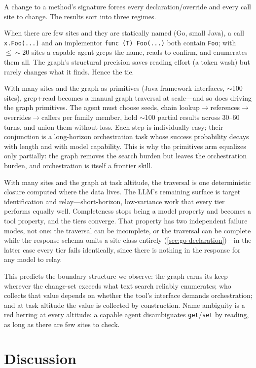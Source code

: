 \documentclass[11pt]{article}
\newcommand{\code}[1]{\texttt{#1}}
\begin{document}
A change to a method's signature forces every declaration/override and
every call site to change. The results sort into three regimes.

When there are few sites and they are statically named (Go, small Java), a
call \code{x.Foo(...)} and an implementor \code{func (T) Foo(...)} both contain
\code{Foo}; with $\le\!\sim$20 sites a capable agent greps the name, reads to
confirm, and enumerates them all. The graph's structural precision saves reading
effort (a token wash) but rarely changes what it finds. Hence the tie.

With many sites and the graph as primitives (Java framework interfaces,
$\sim$100 sites), grep+read becomes a manual graph traversal at scale---and so
does driving the graph primitives. The agent must choose seeds,
chain lookup$\to$references$\to$overrides$\to$callers per family member, hold
$\sim$100 partial results across 30--60 turns, and union them without loss. Each
step is individually easy; their conjunction is a long-horizon orchestration task
whose success probability decays with length and with model capability. This is
why the primitives arm equalizes only partially: the graph removes the
search burden but leaves the orchestration burden, and
orchestration is itself a frontier skill.

With many sites and the graph at task altitude, the traversal is one
deterministic closure computed where the data lives. The LLM's remaining surface
is target identification and relay---short-horizon, low-variance work that every
tier performs equally well. Completeness stops being a model property and
becomes a tool property, and the tiers converge. That property has two
independent failure modes, not one: the traversal can be incomplete, or the
traversal can be complete while the response schema omits a site class
entirely (\cref{sec:go-declaration})---in the latter case every tier fails
identically, since there is nothing in the response for any model to relay.

This predicts the boundary structure we observe: the graph earns its keep
wherever the change-set exceeds what text search reliably enumerates; who
collects that value depends on whether the tool's interface demands
orchestration; and at task altitude the value is collected by construction. Name
ambiguity is a red herring at every altitude: a capable agent disambiguates
\code{get}/\code{set} by reading, as long as there are few sites to check.

\section{Discussion}
\label{sec:discussion}
\end{document}
